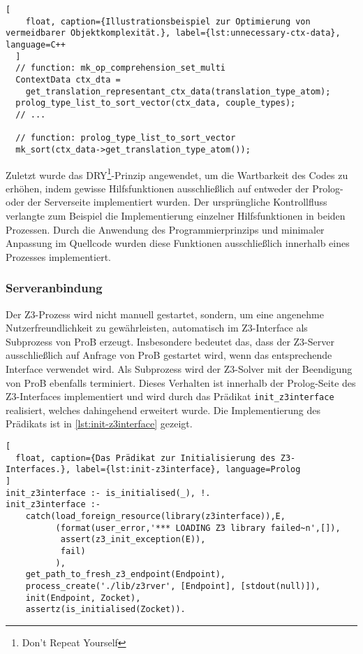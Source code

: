 \begin{lstlisting}[
    float, caption={Illustrationsbeispiel zur Optimierung von vermeidbarer Objektkomplexität.}, label={lst:unnecessary-ctx-data}, language=C++
  ]
  // function: mk_op_comprehension_set_multi
  ContextData ctx_dta =
    get_translation_representant_ctx_data(translation_type_atom);
  prolog_type_list_to_sort_vector(ctx_data, couple_types);
  // ...

  // function: prolog_type_list_to_sort_vector
  mk_sort(ctx_data->get_translation_type_atom());
\end{lstlisting}

Zuletzt wurde das DRY\footnote{Don't Repeat Yourself}-Prinzip angewendet, um die Wartbarkeit des Codes zu erhöhen,
indem gewisse Hilfsfunktionen ausschließlich auf entweder der Prolog- oder der Serverseite implementiert wurden.
Der ursprüngliche Kontrollfluss verlangte zum Beispiel die Implementierung einzelner Hilfsfunktionen
in beiden Prozessen. Durch die Anwendung des Programmierprinzips und minimaler Anpassung im Quellcode wurden diese Funktionen ausschließlich innerhalb eines Prozesses implementiert.

\subsubsection{Serveranbindung}
\label{subsec:server-connection}

Der Z3-Prozess wird nicht manuell gestartet, sondern,
um eine angenehme Nutzerfreundlichkeit zu gewährleisten, automatisch im Z3-Interface als Subprozess von ProB erzeugt.
Insbesondere bedeutet das, dass der Z3-Server ausschließlich auf Anfrage von ProB gestartet wird, wenn das entsprechende Interface verwendet wird.
Als Subprozess wird der Z3-Solver mit der Beendigung von ProB ebenfalls terminiert.
Dieses Verhalten ist innerhalb der Prolog-Seite des Z3-Interfaces implementiert und wird durch das Prädikat \texttt{init\_z3interface} realisiert, welches dahingehend erweitert wurde.
Die Implementierung des Prädikats ist in \cref{lst:init-z3interface} gezeigt.

\begin{lstlisting}[
  float, caption={Das Prädikat zur Initialisierung des Z3-Interfaces.}, label={lst:init-z3interface}, language=Prolog
]
init_z3interface :- is_initialised(_), !.
init_z3interface :-
    catch(load_foreign_resource(library(z3interface)),E,
          (format(user_error,'*** LOADING Z3 library failed~n',[]),
           assert(z3_init_exception(E)),
           fail)
          ),
    get_path_to_fresh_z3_endpoint(Endpoint),
    process_create('./lib/z3rver', [Endpoint], [stdout(null)]),
    init(Endpoint, Zocket),
    assertz(is_initialised(Zocket)).
\end{lstlisting}

